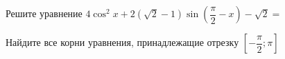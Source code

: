 \begin{ex}
	\begin{condition}
		\begin{enumcols}[label=\asbuk*)]
			\item Решите уравнение \( 4\cos^2 x +2\left(\sqrt{2}-1\right)\sin{\left(\dfrac{\pi}{2}-x\right)}  - \sqrt{2}=  \)
			\item Найдите все корни уравнения, принадлежащие отрезку \( \left[-\dfrac{\pi}{2};\pi\right]  \)
		\end{enumcols}
	\end{condition}
\end{ex}